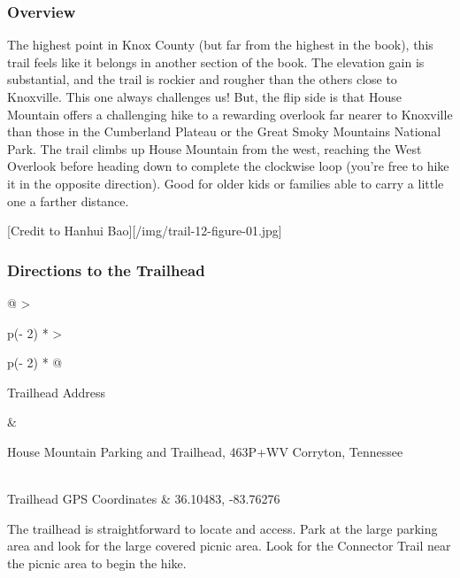 \documentclass[
  letterpaper,
  DIV=11,
  numbers=noendperiod]{scrartcl}
\begin{document}
\hypertarget{overview-11}{%
\subsubsection{Overview}\label{overview-11}}

The highest point in Knox County (but far from the highest in the book),
this trail feels like it belongs in another section of the book. The
elevation gain is substantial, and the trail is rockier and rougher than
the others close to Knoxville. This one always challenges us! But, the
flip side is that House Mountain offers a challenging hike to a
rewarding overlook far nearer to Knoxville than those in the Cumberland
Plateau or the Great Smoky Mountains National Park. The trail climbs up
House Mountain from the west, reaching the West Overlook before heading
down to complete the clockwise loop (you're free to hike it in the
opposite direction). Good for older kids or families able to carry a
little one a farther distance.

{[}Credit to Hanhui Bao{]}{[}/img/trail-12-figure-01.jpg{]}

\hypertarget{directions-to-the-trailhead-11}{%
\subsubsection{Directions to the
Trailhead}\label{directions-to-the-trailhead-11}}

\begin{longtable}[]{@{}
  >{\raggedright\arraybackslash}p{(\columnwidth - 2\tabcolsep) * }
  >{\raggedright\arraybackslash}p{(\columnwidth - 2\tabcolsep) * }@{}}
\toprule\noalign{}
\begin{minipage}[b]{\linewidth}\raggedright
Trailhead Address
\end{minipage} & \begin{minipage}[b]{\linewidth}\raggedright
House Mountain Parking and Trailhead, 463P+WV Corryton, Tennessee
\end{minipage} \\
\midrule\noalign{}
\endhead
\bottomrule\noalign{}
\endlastfoot
Trailhead GPS Coordinates & 36.10483, -83.76276 \\
\end{longtable}

The trailhead is straightforward to locate and access. Park at the large
parking area and look for the large covered picnic area. Look for the
Connector Trail near the picnic area to begin the hike.
\end{document}
